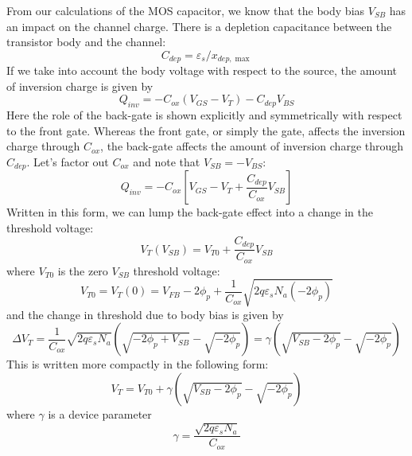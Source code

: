 From our calculations of the MOS capacitor, we know that the body bias $V_{SB}$ has an impact on the channel charge.  There is a depletion capacitance between the transistor body and the channel:
%
\begin{equation}
	{C_{dep}} = {\varepsilon _s}/{x_{dep,\max }}
\end{equation}
%
If we take into account the body voltage with respect to the source, the amount of inversion charge is given by
%
\begin{equation}
	{Q_{inv}} =  - {C_{ox}}({V_{GS}} - {V_T}) - {C_{dep}}{V_{BS}}
\end{equation}
%
Here the role of the back-gate is shown explicitly and symmetrically with respect to the front gate.  Whereas the front gate, or simply the gate, affects the inversion charge through $C_{ox}$, the back-gate affects the amount of inversion charge through $C_{dep}$.  
%
Let's factor out $C_{ox}$ and note that $V_{SB} = - V_{BS}$:
%
\begin{equation}
	{Q_{inv}} =  - {C_{ox}}\left[ {{V_{GS}} - {V_T} + \frac{{{C_{dep}}}}{{{C_{ox}}}}{V_{SB}}} \right]
\end{equation}
%
Written in this form, we can lump the back-gate effect into a change in the threshold voltage:
%
\begin{equation}
	{V_T}({V_{SB}}) = {V_{T0}} + \frac{{{C_{dep}}}}{{{C_{ox}}}}{V_{SB}}
\end{equation}
%
where $V_{T0}$ is the zero $V_{SB}$ threshold voltage:
%
\begin{equation}
{V_{T0}} = {V_T}(0) = {V_{FB}} - 2{\phi _p} + \frac{1}{{{C_{ox}}}}\sqrt {2q{\varepsilon _s}{N_a}( - 2{\phi _p})} 
\end{equation}
%
and the change in threshold due to body bias is given by
%
\begin{equation}
	\Delta {V_T} = \frac{1}{{{C_{ox}}}}\sqrt {2q{\varepsilon _s}{N_a}} \left(\sqrt { - 2{\phi _p} + {V_{SB}}}  - \sqrt { - 2{\phi _p}} \right) = \gamma \left( {\sqrt {{V_{SB}} - 2{\phi _p}}  - \sqrt { - 2{\phi _p}} } \right)
\end{equation}
%
This is written more compactly in the following form:
%
\begin{equation}
	{V_T} = {V_{T0}} + \gamma \left( {\sqrt {{V_{SB}} - 2{\phi _p}}  - \sqrt { - 2{\phi _p}} } \right)
	\label{eq:vtbias}
\end{equation}
%
where $\gamma$ is a device parameter
%
\begin{equation}
	\gamma = \frac{\sqrt{2q\varepsilon_s N_a}}{C_{ox}}
\end{equation}




